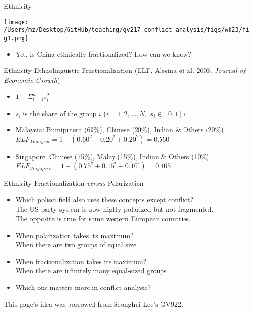 \documentclass{beamer}
\begin{document}
\begin{frame}{Ethnicity}
    \pause
    \begin{center}
        \texttt{[image: /Users/mz/Desktop/GitHub/teaching/gv217\_conflict\_analysis/figs/wk23/fig1.png]}
    \end{center}
    \begin{itemize}
        \pause\item Yet, is China ethnically fractionalized? How can we know?    
    \end{itemize}
\end{frame}

\begin{frame}{Ethnicity}
    \pause Ethnolinguistic Fractionalization (ELF, Alesina et al. 2003, \textit{Journal of Economic Growth})
    \begin{itemize}
        \pause\item \(1 - \Sigma_{i = 1}^{n} s_{i}^2\)
        \pause\item \(s_{i}\) is the share of the group \(i\) (\(i = 1, 2, \ldots, N, \) \(s_{i} \in [0, 1]\))
        \pause\item Malaysia: Bumiputera (60\%), Chinese (20\%), Indian \& Others (20\%)
        \pause      \(ELF_{Malaysia} = 1 - (0.60^2 + 0.20^2 + 0.20^2) = 0.560\)
        \pause\item Singapore: Chinese (75\%), Malay (15\%), Indian \& Others (10\%)
        \pause      \(ELF_{Singapore} = 1 - (0.75^2 + 0.15^2 + 0.10^2) = 0.405\)
    \end{itemize}
\end{frame}

\begin{frame}{Ethnicity}
    \pause Fractionalization \textit{versus} Polarization
    \begin{itemize}
        \pause\item Which polisci field also uses these concepts except conflict?\\
        \pause      The US party system is now highly polarized but not fragmented.\\
        \pause      The opposite is true for some western European countries.
        \pause\item When polarization takes its maximum?\\
        \pause      When there are two groups of equal size
        \pause\item When fractionalization takes its maximum?\\
        \pause      When there are infinitely many equal-sized groups
        \pause\item Which one matters more in conflict analysis?
\end{itemize}
\vfill
\tiny This page's idea was borrowed from Seonghui Lee's GV922.
\end{frame}
\end{document}
